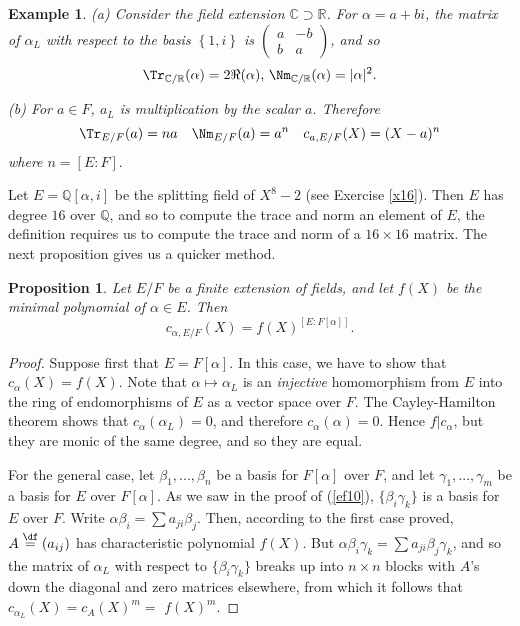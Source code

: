 \documentclass[a4paper,11pt,final,openany]{memoir}
\newtheorem{proposition}[X]{Proposition}
\newtheorem{example}[X]{Example}
\theoremstyle{nonumberplain}
\newtheorem{proof}{Proof.}
\begin{document}
\begin{example}
\label{ag32}(a) Consider the field extension $\mathbb{C}\supset\mathbb{R}$.
For $\alpha=a+bi$, the matrix of $\alpha_{L}$ with respect to the basis
$\left\{  1,i\right\}  $ is $\left(
\begin{smallmatrix}
a & -b\\
b & a
\end{smallmatrix}
\right)  $, and so
\[
\Tr_{\mathbb{C}/\mathbb{R}}(\alpha)=2\Re(\alpha)\text{, }\Nm_{\mathbb{C}%
/\mathbb{R}}(\alpha)=|\alpha|^{2}.
\]


(b) For $a\in F$, $a_{L}$ is multiplication by the scalar $a$. Therefore%
\[
\Tr_{E/F}(a)=na\quad\Nm_{E/F}(a)=a^{n}\quad c_{a,E/F}(X)=(X-a)^{n}%
\]
where $n=[E\colon F].$
\end{example}

Let $E=\mathbb{Q}[\alpha,i]$ be the splitting field of $X^{8}-2$ (see Exercise
\ref{x16}). Then $E$ has degree $16$ over $\mathbb{Q}{}$, and so to compute
the trace and norm an element of $E$, the definition requires us to compute
the trace and norm of a $16\times16$ matrix. The next proposition gives us a
quicker method.

\begin{proposition}
\label{ag33}Let $E/F$ be a finite extension of fields, and let $f(X)$ be the
minimal polynomial of $\alpha\in E$. Then
\[
c_{\alpha,E/F}(X)=f(X)^{[E\colon F[\alpha]]}.
\]

\end{proposition}

\begin{proof}
Suppose first that $E=F[\alpha]$. In this case, we have to show that
$c_{\alpha}(X)=f(X)$. Note that $\alpha\mapsto\alpha_{L}$ is an
\emph{injective\/} homomorphism from $E$ into the ring of endomorphisms of $E$
as a vector space over $F$. The Cayley-Hamilton theorem shows that $c_{\alpha
}(\alpha_{L})=0$, and therefore $c_{\alpha}(\alpha)=0$. Hence $f|c_{\alpha}$,
but they are monic of the same degree, and so they are equal.

For the general case, let $\beta_{1},...,\beta_{n}$ be a basis for $F[\alpha]$
over $F$, and let $\gamma_{1},...,\gamma_{m}$ be a basis for $E$ over
$F[\alpha]$. As we saw in the proof of (\ref{ef10}), $\{\beta_{i}\gamma_{k}\}$
is a basis for $E$ over $F$. Write $\alpha\beta_{i}=\sum a_{ji}\beta_{j}$.
Then, according to the first case proved, $A\overset{\df%
}{=}(a_{ij})$ has characteristic polynomial $f(X)$. But $\alpha\beta_{i}%
\gamma_{k}=\sum a_{ji}\beta_{j}\gamma_{k}$, and so the matrix of $\alpha_{L}$
with respect to $\{\beta_{i}\gamma_{k}\}$ breaks up into $n\times n$ blocks
with $A$'s down the diagonal and zero matrices elsewhere, from which it
follows that $c_{\alpha_{L}}(X)=c_{A}(X)^{m}=$ $f(X)^{m}.$
\end{proof}
\end{document}
